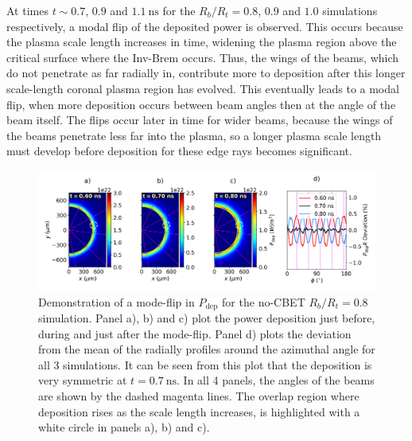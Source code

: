 At times $t\sim0.7$, $0.9$ and $1.1\ \text{ns}$ for the $R_b/R_t=0.8$, $0.9$ and $1.0$ simulations respectively, a modal flip of the deposited power is observed.
This occurs because the plasma scale length increases in time, widening the plasma region above the critical surface where the \ac{Inv-Brem} occurs.
Thus, the wings of the beams, which do not penetrate as far radially in, contribute more to deposition after this longer scale-length coronal plasma region has evolved.
This eventually leads to a modal flip, when more deposition occurs between beam angles then at the angle of the beam itself.
The flips occur later in time for wider beams, because the wings of the beams penetrate less far into the plasma, so a longer plasma scale length must develop before deposition for these edge rays becomes significant.

\begin{figure}[t!]
    \includegraphics[width=\linewidth]{Results1/Images/NoCBET_modeflip.png}
    \centering
    \caption{Demonstration of a mode-flip in $P_{\text{dep}}$ for the no-\ac{CBET} $R_b/R_t=0.8$ simulation.
    Panel a), b) and c) plot the power deposition just before, during and just after the mode-flip.
    Panel d) plots the deviation from the mean of the radially profiles around the azimuthal angle for all 3 simulations.
    It can be seen from this plot that the deposition is very symmetric at $t=0.7\ \text{ns}$.
    In all 4 panels, the angles of the beams are shown by the dashed magenta lines.
    The overlap region where deposition rises as the scale length increases, is highlighted with a white circle in panels a), b) and c).}%
    \label{fig:Res1_Deposition_change}
\end{figure}

